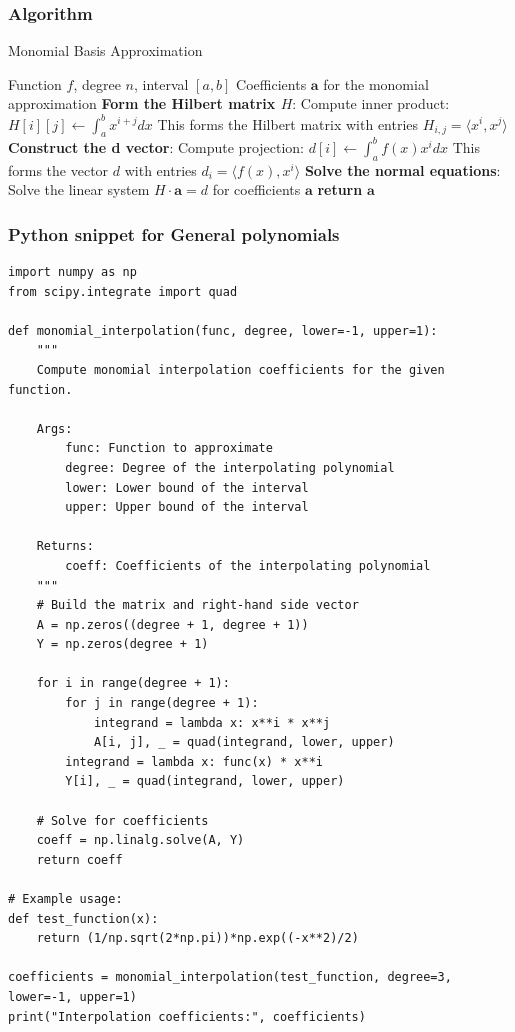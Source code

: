 \documentclass[10pt]{article}
\begin{document}
\subsubsection{Algorithm}
\begin{algorithm}[H]
\caption{Monomial Basis Approximation}\label{alg:monomial}
\begin{algorithmic}
\Require Function $f$, degree $n$, interval $[a, b]$
\Ensure Coefficients $\mathbf{a}$ for the monomial approximation
\State \textbf{Form the Hilbert matrix $H$}:
        \State Compute inner product: $H[i][j] \gets \int_{a}^{b} x^{i+j} dx$
        \State This forms the Hilbert matrix with entries $H_{i,j} = \langle x^i, x^j \rangle$
    \EndFor
\EndFor
\State \textbf{Construct the d vector}:
    \State Compute projection: $d[i] \gets \int_{a}^{b} f(x) x^{i} dx$
    \State This forms the vector $d$ with entries $d_i = \langle f(x), x^i \rangle$
\EndFor
\State \textbf{Solve the normal equations}:
\State Solve the linear system $H \cdot \mathbf{a} = d$ for coefficients $\mathbf{a}$
\State \textbf{return} $\mathbf{a}$
\end{algorithmic}
\end{algorithm}

\subsubsection{Python snippet for General polynomials}
\begin{lstlisting}[caption={Monomial Interpolation}, label=code:monointerpolation]
import numpy as np
from scipy.integrate import quad

def monomial_interpolation(func, degree, lower=-1, upper=1):
    """
    Compute monomial interpolation coefficients for the given function.
    
    Args:
        func: Function to approximate
        degree: Degree of the interpolating polynomial
        lower: Lower bound of the interval
        upper: Upper bound of the interval
        
    Returns:
        coeff: Coefficients of the interpolating polynomial
    """
    # Build the matrix and right-hand side vector
    A = np.zeros((degree + 1, degree + 1))
    Y = np.zeros(degree + 1)
    
    for i in range(degree + 1):
        for j in range(degree + 1):
            integrand = lambda x: x**i * x**j
            A[i, j], _ = quad(integrand, lower, upper)
        integrand = lambda x: func(x) * x**i
        Y[i], _ = quad(integrand, lower, upper)
    
    # Solve for coefficients
    coeff = np.linalg.solve(A, Y)
    return coeff

# Example usage:
def test_function(x):
    return (1/np.sqrt(2*np.pi))*np.exp((-x**2)/2)

coefficients = monomial_interpolation(test_function, degree=3, lower=-1, upper=1)
print("Interpolation coefficients:", coefficients)
\end{lstlisting}
\end{document}
